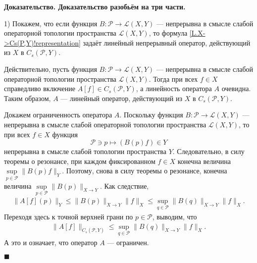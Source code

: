 \documentclass{report}
\newenvironment{Proof}{\par\noindent\bf Доказательство.\rm}{ $\blacksquare$\par}
\begin{document}
\begin{Proof}
Доказательство разобьём на три части.

1) Покажем, что если функция $B:\mathcal{P}\to\mathcal{L}(X,Y)$ --- непрерывна в смысле слабой операторной топологии пространства $\mathcal{L}(X,Y)$, то формула
\eqref{L.X->Cs(P,Y)!representation} задаёт линейный непрерывный оператор, действующий из $X$ в $C_s(\mathcal{P},Y)$.

Действительно, пусть функция $B:\mathcal{P}\to\mathcal{L}(X,Y)$ --- непрерывна в смысле слабой операторной топологии пространства $\mathcal{L}(X,Y)$. Тогда при всех $f\in X$ справедливо
включение $A[f]\in C_s(\mathcal{P},Y)$, а линейность оператора $A$ очевидна. Таким образом, $A$ --- линейный оператор, действующий из $X$ в $C_s(\mathcal{P},Y)$.

Докажем ограниченность оператора $A$. Поскольку функция $B:\mathcal{P}\to\mathcal{L}(X,Y)$ --- непрерывна в смысле слабой операторной топологии пространства $\mathcal{L}(X,Y)$, то
при всех $f\in X$ функция
$$
\mathcal{P}\ni p\mapsto (B(p)f) \in Y
$$
непрерывна в смысле слабой топологии пространства $Y$. Следовательно, в силу теоремы о резонансе, при каждом фиксированном $f\in X$ конечна величина
$\sup\limits_{p\in\mathcal{P}}\|B(p)f\|_Y$. Поэтому, снова в силу теоремы о резонансе, конечна величина $\sup\limits_{p\in\mathcal{P}}\|B(p)\|_{X\to Y}$. Как следствие,
\begin{gather*}
\|A[f](p)\|_Y\leqslant\|B(p)\|_{X\to Y}\|f\|_X\leqslant\sup\limits_{q\in\mathcal{P}}\|B(q)\|_{X\to Y}\|f\|_{X}.
\end{gather*}
Переходя здесь к точной верхней грани по $p\in\mathcal{P}$, выводим, что
\begin{gather*}
\|A[f]\|_{C_s(\mathcal{P},Y)}\leqslant\sup\limits_{q\in\mathcal{P}}\|B(q)\|_{X\to Y}\|f\|_{X}.
\end{gather*}
А это и означает, что оператор $A$ --- ограничен.



\end{Proof}
\end{document}
